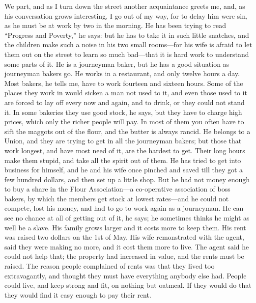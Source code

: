 \documentclass{book}
\begin{document}
We part, and as I turn down the street another acquaintance greets me, and, as his conversation grows interesting, I go out of my way, for to delay him were sin, as he must be at work by two in the morning. He has been trying to read “Progress and Poverty,” he says: but he has to take it in such little snatches, and the children make such a noise in his two small rooms—for his wife is afraid to let them out on the street to learn so much bad—that it is hard work to understand some parts of it. He is a journeyman baker, but he has a good situation as journeyman bakers go. He works in a restaurant, and only twelve hours a day. Most bakers, he tells me, have to work fourteen and sixteen hours. Some of the places they work in would sicken a man not used to it, and even those used to it are forced to lay off every now and again, and to drink, or they could not stand it. In some bakeries they use good stock, he says, but they have to charge high prices, which only the richer people will pay. In most of them you often have to sift the maggots out of the flour, and the butter is always rancid. He belongs to a Union, and they are trying to get in all the journeyman bakers; but those that work longest, and have most need of it, are the hardest to get. Their long hours make them stupid, and take all the spirit out of them. He has tried to get into business for himself, and he and his wife once pinched and saved till they got a few hundred dollars, and then set up a little shop. But he had not money enough to buy a share in the Flour Association—a co-operative association of boss bakers, by which the members get stock at lowest rates—and he could not compete, lost his money, and had to go to work again as a journeyman. He can see no chance at all of getting out of it, he says; he sometimes thinks he might as well be a slave. His family grows larger and it costs more to keep them. His rent was raised two dollars on the 1st of May. His wife remonstrated with the agent, said they were making no more, and it cost them more to live. The agent said he could not help that; the property had increased in value, and the rents must be raised. The reason people complained of rents was that they lived too extravagantly, and thought they must have everything anybody else had. People could live, and keep strong and fit, on nothing but oatmeal. If they would do that they would find it easy enough to pay their rent.
\end{document}
